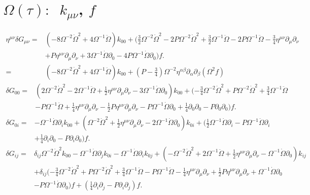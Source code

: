 \documentclass[10pt,letterpaper]{article}
\begin{document}
\section*{ $\Omega(\tau):$\  $k_{\mu\nu}$, $f$}
\begin{align}
\eta^{\mu\nu}\delta G_{\mu\nu}={}&(-8 \Omega^{-2} \dot{\Omega}^2
 + 4 \Omega^{-1} \ddot{\Omega}) k_{00}
 + (\tfrac{3}{2} \Omega^{-2} \dot{\Omega}^2
 - 2 P \Omega^{-2} \dot{\Omega}^2
 + \tfrac{3}{2} \Omega^{-1} \ddot{\Omega}
 - 2 P \Omega^{-1} \ddot{\Omega}
 -  \tfrac{3}{4} \eta^{\mu \nu} \partial_{\mu} \partial_{\nu}\nonumber\\
& + P \eta^{\mu \nu} \partial_{\mu} \partial_{\nu}
 + 3 \Omega^{-1} \dot{\Omega} \partial_{0}
 - 4 P \Omega^{-1} \dot{\Omega} \partial_{0}) f.
\nonumber \\ 
={}&(-8 \Omega^{-2} \dot{\Omega}^2
 + 4 \Omega^{-1} \ddot{\Omega}) k_{00} +(P-\tfrac34) \Omega^{-2}\eta^{\alpha\beta}\partial_\alpha\partial_\beta (\Omega^{2} f)
\end{align}
\begin{align}
\delta G_{00}={}&(2 \Omega^{-2} \dot{\Omega}^2
 - 2 \Omega^{-1} \ddot{\Omega}
 + \tfrac{1}{2} \eta^{\mu \nu} \partial_{\mu} \partial_{\nu}
 - 3 \Omega^{-1} \dot{\Omega} \partial_{0}) k_{00}
 + (- \tfrac{3}{4} \Omega^{-2} \dot{\Omega}^2
 + P \Omega^{-2} \dot{\Omega}^2
 + \tfrac{3}{4} \Omega^{-1} \ddot{\Omega}\nonumber\\
& -  P \Omega^{-1} \ddot{\Omega}
 + \tfrac{1}{4} \eta^{\mu \nu} \partial_{\mu} \partial_{\nu}
 -  \tfrac{1}{2} P \eta^{\mu \nu} \partial_{\mu} \partial_{\nu}
 -  P \Omega^{-1} \dot{\Omega} \partial_{0}
 + \tfrac{1}{4} \partial_{0} \partial_{0}
 -  P \partial_{0} \partial_{0}) f.
\end{align}
\begin{align}
\delta G_{0i}={}&- \Omega^{-1} \dot{\Omega} \partial_{i} k_{00}
 + (\Omega^{-2} \dot{\Omega}^2
 + \tfrac{1}{2} \eta^{\mu \nu} \partial_{\mu} \partial_{\nu}
 - 2 \Omega^{-1} \dot{\Omega} \partial_{0}) k_{0i}
 + (\tfrac{1}{2} \Omega^{-1} \dot{\Omega} \partial_{i}
 -  P \Omega^{-1} \dot{\Omega} \partial_{i}\nonumber\\
& + \tfrac{1}{4} \partial_{i} \partial_{0}
 -  P \partial_{i} \partial_{0}) f.
\end{align}
\begin{align}
\delta G_{ij}={}&\delta_{ij}\Omega^{-2} \dot{\Omega}^2 k_{00}
- \Omega^{-1} \dot{\Omega} \partial_{j} k_{0i}
 -  \Omega^{-1} \dot{\Omega} \partial_{i} k_{0j}
 + (- \Omega^{-2} \dot{\Omega}^2
 + 2 \Omega^{-1} \ddot{\Omega}
 + \tfrac{1}{2} \eta^{\mu \nu} \partial_{\mu} \partial_{\nu}
 -  \Omega^{-1} \dot{\Omega} \partial_{0}) k_{ij}\nonumber\\
& +\delta_{ij}(- \tfrac{3}{4} \Omega^{-2} \dot{\Omega}^2
 + P \Omega^{-2} \dot{\Omega}^2
 + \tfrac{3}{4} \Omega^{-1} \ddot{\Omega}
 -  P \Omega^{-1} \ddot{\Omega}
 -  \tfrac{1}{4} \eta^{\mu \nu} \partial_{\mu} \partial_{\nu}
 + \tfrac{1}{2} P \eta^{\mu \nu} \partial_{\mu} \partial_{\nu}
 + \Omega^{-1} \dot{\Omega} \partial_{0}\nonumber\\
& -  P \Omega^{-1} \dot{\Omega} \partial_{0})f
 + (\tfrac{1}{4} \partial_{i} \partial_{j}
 -  P \partial_{i} \partial_{j}) f.
\end{align}
\\
\end{document}
